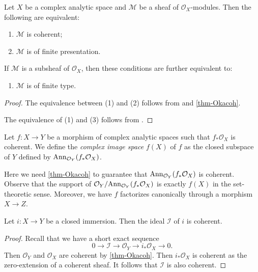 \begin{corollary}\label{cor-cohsheaffinitepre}
    Let $X$ be a complex analytic space and $\mathcal{M}$ be a sheaf of $\mathcal{O}_X$-modules. Then the following are equivalent:
    \begin{enumerate}
        \item $\mathcal{M}$ is coherent;
        \item $\mathcal{M}$ is of finite presentation.
    \end{enumerate}
    If $\mathcal{M}$ is a subsheaf of $\mathcal{O}_X$, then these conditions are further equivalent to:
    \begin{enumerate}[resume]
        \item $\mathcal{M}$ is of finite type.
    \end{enumerate}
\end{corollary}
\begin{proof}
    The equivalence between (1) and (2) follows from \cite[\href{https://stacks.math.columbia.edu/tag/01BZ}{Tag 01BZ}]{stacks-project} and \cref{thm-Okacoh}.

    The equivalence of (1) and (3) follows from \cite[\href{https://stacks.math.columbia.edu/tag/01BY}{Tag 01BY}]{stacks-project}.
\end{proof}

\begin{definition}
    Let $f:X\rightarrow Y$ be a morphism of complex analytic spaces such that $f_*\mathcal{O}_X$ is coherent. We define the \emph{complex image space} $f(X)$ of $f$ as the closed subspace of $Y$ defined by $\mathrm{Ann}_{\mathcal{O}_Y}(f_*\mathcal{O}_X)$.
\end{definition}
Here we need \cref{thm-Okacoh} to guarantee that $\mathrm{Ann}_{\mathcal{O}_Y}(f_*\mathcal{O}_X)$ is coherent. Observe that the support of $\mathcal{O}_Y/\mathrm{Ann}_{\mathcal{O}_Y}(f_*\mathcal{O}_X)$ is exactly $f(X)$ in the set-theoretic sense. Moreover, we have $f$ factorizes canonically through a morphism $X\rightarrow Z$.

\begin{corollary}\label{cor-closedimmidealcoh}
    Let $i:X\rightarrow Y$ be a closed immersion. Then the ideal $\mathcal{I}$ of $i$ is coherent.
\end{corollary}
\begin{proof}
    Recall that we have a short exact sequence 
    \[
        0\rightarrow \mathcal{I} \rightarrow \mathcal{O}_Y\rightarrow i_*\mathcal{O}_X\rightarrow 0.
    \]
    Then $\mathcal{O}_Y$ and $\mathcal{O}_X$ are coherent by \cref{thm-Okacoh}. Then $i_*\mathcal{O}_X$ is coherent as the zero-extension of a coherent sheaf. It follows that $\mathcal{I}$ is also coherent.
\end{proof}



